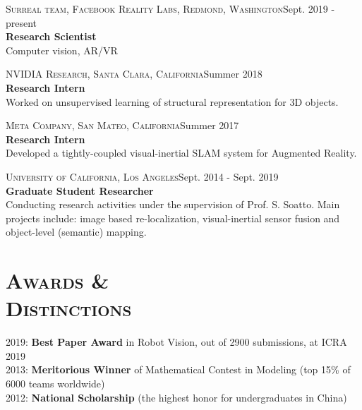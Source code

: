 \documentclass[margin, line, 10pt]{res} %
\begin{document}
\begin{resume}
\textsc{Surreal team, Facebook Reality Labs, Redmond, Washington}\hfill Sept. 2019 - present \\
\textbf{Research Scientist}\\
Computer vision, AR/VR

\textsc{NVIDIA Research, Santa Clara, California}\hfill Summer 2018\\
\textbf{Research Intern}\\
Worked on unsupervised learning of structural representation for 3D objects.

\textsc{Meta Company, San Mateo, California}\hfill Summer 2017\\
\textbf{Research Intern}\\
Developed a tightly-coupled visual-inertial SLAM system for Augmented Reality.

\textsc{University of California, Los Angeles}\hfill Sept. 2014 - Sept. 2019\\
\textbf{Graduate Student Researcher}\\
Conducting research activities under the supervision of Prof. S. Soatto. Main projects include: image based re-localization, visual-inertial sensor fusion and object-level (semantic) mapping.




\section{\textsc{Awards \&\\Distinctions}}
2019: {\bf Best Paper Award} in Robot Vision, out of 2900 submissions, at ICRA 2019\\
2013: {\bf Meritorious Winner} of Mathematical Contest in Modeling (top 15\% of 6000 teams worldwide)\\
2012: {\bf National Scholarship} (the highest honor for undergraduates in China)


\end{resume}
\end{document}
